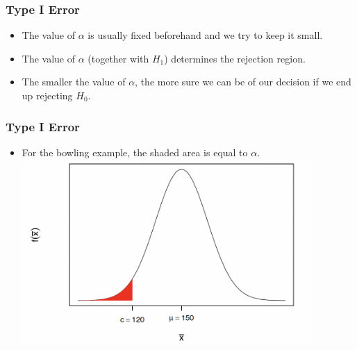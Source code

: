 \documentclass[12pt]{beamer}
\begin{document}
\begin{frame}
	\frametitle{Type I Error}
	\begin{itemize}[label={\color{blue}$\blacktriangleright$}]
		\item The value of $\alpha$ is usually fixed beforehand and we try to keep it small.
		\item The value of $\alpha$ (together with $H_1$) determines the rejection region.
		\item The smaller the value of $\alpha$, the more sure we can be of our decision if we end up rejecting $H_0$.
	\end{itemize}
	
\end{frame}

\begin{frame}
	\frametitle{Type I Error}
	\begin{itemize}[label={\color{blue}$\blacktriangleright$}]
		\item For the bowling example, the shaded area is equal to $\alpha$.
		\centering
		\includegraphics[width=11cm]{type1.png}
	\end{itemize}
	
\end{frame}
\end{document}
